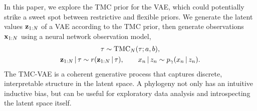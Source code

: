 In this paper, we explore the TMC prior for the VAE, which could potentially strike a sweet spot between restrictive and flexible priors.
We generate the latent values $\mathbf{z}_{1:N}$ of a VAE according to the TMC prior, then generate observations $\mathbf{x}_{1:N}$ using a neural network observation model,
\begin{gather}
        \tau \sim \mathrm{TMC}_N(\tau; a, b), \\
        \mathbf{z}_{1:N} \,|\, \tau \sim r(\mathbf{z}_{1:N} \,|\, \tau),
        \qquad
        x_n \,|\, z_n \sim p_\gamma(x_n \,|\, z_n).
\end{gather}
The TMC-VAE is a coherent
generative process that captures
discrete, interpretable structure in the latent space.
A phylogeny not only has an intuitive inductive bias,
but can be useful for
exploratory data analysis
and introspecting the latent space itself.

